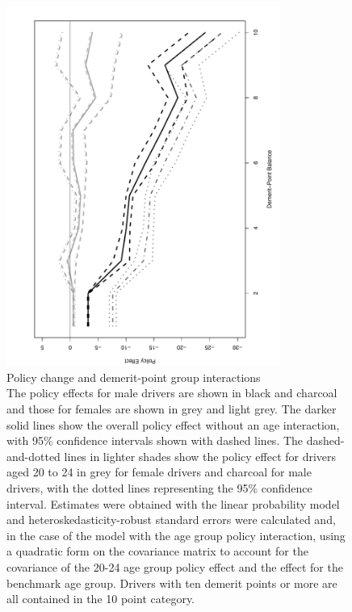 \begin{figure}
\centering
\includegraphics[width=0.8\textwidth, angle =270]{Figures/points_fig_with_age_int}
\caption{Policy change and demerit-point group interactions \\
The policy effects for male drivers are shown in black and charcoal
and those for females are shown in grey and light grey.
The darker solid lines show the overall policy effect without an age interaction,
with 95\% confidence intervals shown with dashed lines.
The dashed-and-dotted lines in lighter shades show the policy effect 
for drivers aged 20 to 24
in grey for female drivers and charcoal for male drivers,
with the dotted lines representing the 95\% confidence interval.
Estimates were obtained with the linear probability model
and heteroskedasticity-robust standard errors were calculated 
and, in the case of the model with the age group policy interaction,
using a quadratic form on the covariance matrix to account for the covariance of the
20-24 age group policy effect and the effect for the benchmark age group.
Drivers with ten demerit points or more are all contained in the 10 point category.
}\label{fig:points_fig_with_age_int}
\end{figure}
